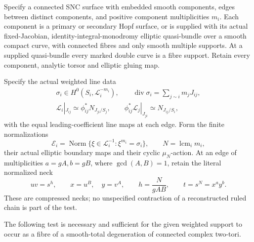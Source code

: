 
\begin{proposition}\label{cdp:st:C.2.UN.63}
Specify a connected SNC surface with embedded smooth components,
edges between distinct components, and positive component
multiplicities \(m_i\). Each component is a primary or secondary
Hopf surface, or is supplied with its actual fixed-Jacobian,
identity-integral-monodromy elliptic quasi-bundle over a smooth
compact curve, with connected fibres and only smooth multiple
supports. At a supplied quasi-bundle every marked double curve
is a fibre support. Retain every component, analytic torsor and
elliptic gluing map.

Specify the actual weighted line data
\[
 \begin{gathered}
 \sigma_i\in H^0(S_i,\mathcal L_i^{-m_i}),\qquad
 \operatorname{div}\sigma_i=\sum_{j\sim i}m_jJ_{ij},\\
 \mathcal L_i|_{J_{ij}}\simeq
       \phi_{ij}^{*}N_{J_{ji}/S_j},\qquad
 \phi_{ij}^{*}\mathcal L_j|_{J_{ji}}
       \simeq N_{J_{ij}/S_i},
 \end{gathered}
 \tag{C.WT.1}\label{cdp:eq:C.WT.1}
\]
with the equal leading-coefficient line maps at each edge.
Form the finite normalizations
\[
 \mathcal E_i=\operatorname{Norm}
       \{\xi\in\mathcal L_i^{-1}:\xi^{m_i}=\sigma_i\},
 \qquad N=\operatorname{lcm}_i m_i,
 \tag{C.WT.2}\label{cdp:eq:C.WT.2}
\]
their actual elliptic boundary maps and their cyclic
\(\mu_N\)-action. At an edge of multiplicities \(a=gA,b=gB\),
where \(\gcd(A,B)=1\), retain the literal normalized neck
\[
       uv=s^h,\qquad x=u^B,\quad y=v^A,\qquad
       h=\frac{N}{gAB},\qquad t=s^N=x^a y^b.
 \tag{C.WT.3}\label{cdp:eq:C.WT.3}
\]
These are compressed necks; no unspecified contraction of a
reconstructed ruled chain is part of the test.

The following test is necessary and sufficient for the given
weighted support to occur as a fibre of a smooth-total
degeneration of connected complex two-tori.


\end{proposition}
